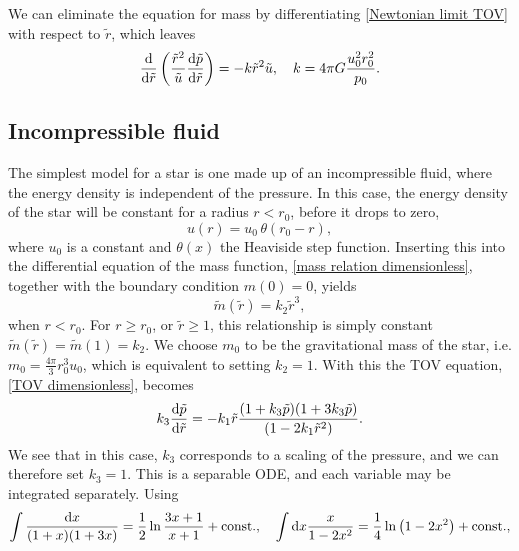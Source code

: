 We can eliminate the equation for mass by differentiating \autoref{Newtonian limit TOV} with respect to $\tilde r$, which leaves
%
\begin{equation}
    \diff{}{\tilde r} 
    \left( \frac{\tilde r^2}{\tilde u} \diff{\tilde p}{\tilde r}\right) 
    = -  k \tilde r^2  \tilde u, \quad
    k = 4 \pi G \frac{u_0^2 r^2_0}{p_0}.
\end{equation}



\subsection*{Incompressible fluid}

The simplest model for a star is one made up of an incompressible fluid, where the energy density is independent of the pressure.
In this case, the energy density of the star will be constant for a radius $r < r_0$, before it drops to zero,
%
\begin{equation}
    u(r) = u_0 \, \theta (r_0 - r),
\end{equation}
%
where $u_0$ is a constant and $\theta(x)$ the Heaviside step function.
Inserting this into the differential equation of the mass function, \autoref{mass relation dimensionless}, together with the boundary condition $m(0) = 0$, yields
%
\begin{equation}
    \tilde m(\tilde r) = k_2 \tilde r^3,
\end{equation}
%
when $r < r_0$.
For $r \geq r_0$, or $\tilde r \geq 1$, this relationship is simply constant $\tilde m(\tilde r) = \tilde m(1) = k_2$.
We choose $m_0$ to be the gravitational mass of the star, i.e. $m_0 = \frac{4 \pi }{3} r_0^3 u_0$, which is equivalent to setting $k_2 = 1$.
With this the TOV equation, \autoref{TOV dimensionless}, becomes
%
\begin{equation} 
    k_3 \diff{\tilde p}{\tilde r} 
    = - k_1 \tilde r 
    \frac{(1 + k_3 \tilde p)(1 + 3 k_3 \tilde p)}{(1 - 2 k_1 \tilde r^2)}.
\end{equation}
%
We see that in this case, $k_3$ corresponds to a scaling of the pressure, and we can therefore set $k_3 = 1$.
This is a separable ODE, and each variable may be integrated separately.
Using
%
\begin{align}
    \int \frac{\text{d} x}{(1 + x)(1 + 3x)}
    = \frac{1}{2} \ln \frac{3x + 1}{x + 1} + \mathrm{const.} , \quad
    \int \text{d} x \frac{x}{1 - 2 x^2} 
    = \frac{1}{4}\ln\left(1 - 2 x^2 \right)
    + \mathrm{const.},
\end{align}
